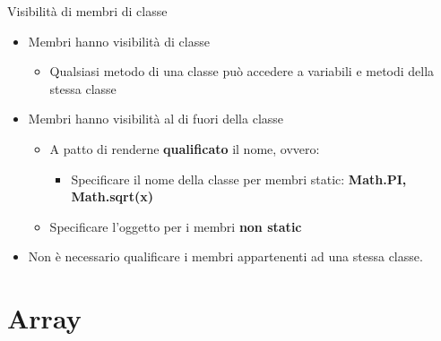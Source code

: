 \begin{frame}
\begin{block}{Visibilità di membri di classe}
\begin{itemize}
\item Membri \textbf{} hanno visibilità di classe
\begin{itemize}
\item Qualsiasi metodo di una classe può accedere a variabili e metodi della stessa classe
\end{itemize}
\item Membri \textbf{} hanno visibilità al di fuori della classe
\begin{itemize}
\item A patto di renderne \textbf{\alert{qualificato}} il nome, ovvero:
\begin{itemize}
\item Specificare il nome della classe per membri static: \textbf{Math.PI, Math.sqrt(x)}
\end{itemize}
\item Specificare l'oggetto per i membri \textbf{non static}
\end{itemize}
\item Non è necessario qualificare i membri appartenenti ad una stessa classe.
\end{itemize}
\end{block}
\end{frame}

\section*{Array}
\begin{frame}
\begin{block}{}
\begin{huge}
\begin{center}
\end{center}
\end{huge}
\end{block}
\end{frame}



